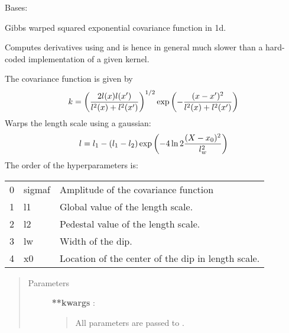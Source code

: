 \documentclass[letterpaper,10pt,english]{sphinxmanual}
\begin{document}

\begin{fulllineitems}
\label{gptools.kernel:gptools.kernel.gibbs.GibbsKernel1dGaussArb}
Bases: {\hyperref[gptools.kernel:gptools.kernel.core.ArbitraryKernel]{}}

Gibbs warped squared exponential covariance function in 1d.

Computes derivatives using  and is hence in general
much slower than a hard-coded implementation of a given kernel.

The covariance function is given by
\begin{gather}
\begin{split}k = \left ( \frac{2l(x)l(x')}{l^2(x)+l^2(x')} \right )^{1/2}\exp\left ( -\frac{(x-x')^2}{l^2(x)+l^2(x')} \right )\end{split}\notag
\end{gather}
Warps the length scale using a gaussian:
\begin{gather}
\begin{split}l = l_1 - (l_1 - l_2) \exp\left ( -4\ln 2\frac{(X-x_0)^2}{l_{w}^{2}} \right )\end{split}\notag
\end{gather}
The order of the hyperparameters is:

\begin{tabulary}{\linewidth}{|L|L|L|}
\hline

0
 & 
sigmaf
 & 
Amplitude of the covariance function
\\

1
 & 
l1
 & 
Global value of the length scale.
\\

2
 & 
l2
 & 
Pedestal value of the length scale.
\\

3
 & 
lw
 & 
Width of the dip.
\\

4
 & 
x0
 & 
Location of the center of the dip in length scale.
\\
\hline\end{tabulary}

\begin{quote}\begin{description}
\item[{Parameters}] \leavevmode
\textbf{**kwargs} :
\begin{quote}

All parameters are passed to {\hyperref[gptools.kernel:gptools.kernel.core.Kernel]{}}.
\end{quote}

\end{description}\end{quote}

\end{fulllineitems}
\end{document}

